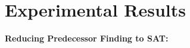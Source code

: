 \section{Experimental Results}
\label{sec:experiments}

\noindent
\textbf{Reducing Predecessor Finding to SAT:}
